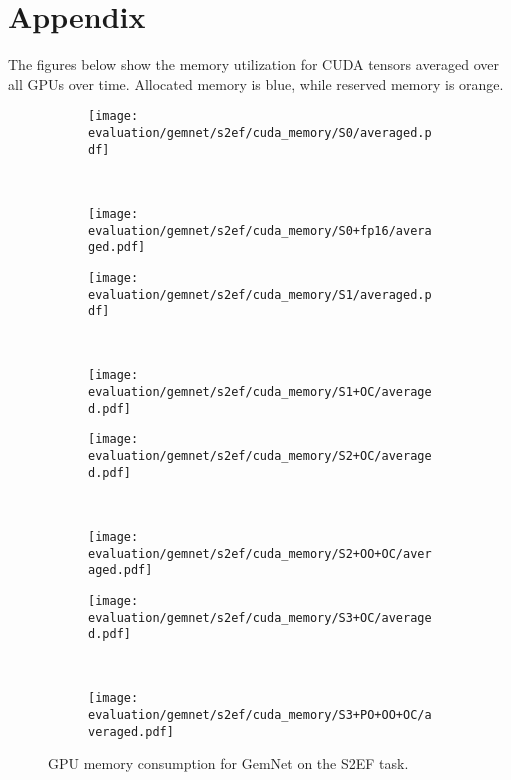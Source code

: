 \section*{Appendix}

The figures below show the memory utilization for 
CUDA tensors averaged over all GPUs over time. 
Allocated memory is \textcolor{tum-dark-blue}{blue},
while reserved memory is \textcolor{tum-orange}{orange}.

\begin{figure}[H]

    \centering

    \begin{subfigure}[t]{0.45\textwidth}
        \centering
        \texttt{[image: evaluation/gemnet/s2ef/cuda\_memory/S0/averaged.pdf]}
    \end{subfigure}%
    ~
    \begin{subfigure}[t]{0.45\textwidth}
        \centering
        \texttt{[image: evaluation/gemnet/s2ef/cuda\_memory/S0+fp16/averaged.pdf]}
    \end{subfigure}

    \begin{subfigure}[t]{0.45\textwidth}
        \centering
        \texttt{[image: evaluation/gemnet/s2ef/cuda\_memory/S1/averaged.pdf]}
    \end{subfigure}%
    ~
    \begin{subfigure}[t]{0.45\textwidth}
        \centering
        \texttt{[image: evaluation/gemnet/s2ef/cuda\_memory/S1+OC/averaged.pdf]}
    \end{subfigure}

    \begin{subfigure}[t]{0.45\textwidth}
        \centering
        \texttt{[image: evaluation/gemnet/s2ef/cuda\_memory/S2+OC/averaged.pdf]}
    \end{subfigure}%
    ~
    \begin{subfigure}[t]{0.45\textwidth}
        \centering
        \texttt{[image: evaluation/gemnet/s2ef/cuda\_memory/S2+OO+OC/averaged.pdf]}
    \end{subfigure}

    \begin{subfigure}[t]{0.45\textwidth}
        \centering
        \texttt{[image: evaluation/gemnet/s2ef/cuda\_memory/S3+OC/averaged.pdf]}
    \end{subfigure}%
    ~
    \begin{subfigure}[t]{0.45\textwidth}
        \centering
        \texttt{[image: evaluation/gemnet/s2ef/cuda\_memory/S3+PO+OO+OC/averaged.pdf]}
    \end{subfigure}

    \caption{GPU memory consumption for GemNet on the S2EF task.}
    
\end{figure}

